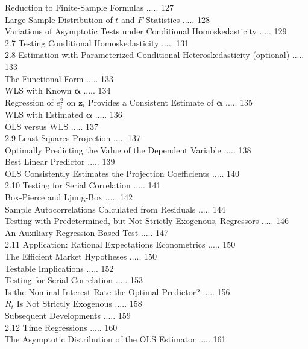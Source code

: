 \documentclass[10pt]{article}
\begin{document}
Reduction to Finite-Sample Formulas ..... 127\\
Large-Sample Distribution of $t$ and $F$ Statistics ..... 128\\
Variations of Asymptotic Tests under Conditional Homoskedasticity ..... 129\\
2.7 Testing Conditional Homoskedasticity ..... 131\\
2.8 Estimation with Parameterized Conditional Heteroskedasticity (optional) ..... 133\\
The Functional Form ..... 133\\
WLS with Known $\boldsymbol{\alpha}$ ..... 134\\
Regression of $e_{i}^{2}$ on $\mathbf{z}_{i}$ Provides a Consistent Estimate of $\boldsymbol{\alpha}$ ..... 135\\
WLS with Estimated $\boldsymbol{\alpha}$ ..... 136\\
OLS versus WLS ..... 137\\
2.9 Least Squares Projection ..... 137\\
Optimally Predicting the Value of the Dependent Variable ..... 138\\
Best Linear Predictor ..... 139\\
OLS Consistently Estimates the Projection Coefficients ..... 140\\
2.10 Testing for Serial Correlation ..... 141\\
Box-Pierce and Ljung-Box ..... 142\\
Sample Autocorrelations Calculated from Residuals ..... 144\\
Testing with Predetermined, but Not Strictly Exogenous, Regressors ..... 146\\
An Auxiliary Regression-Based Test ..... 147\\
2.11 Application: Rational Expectations Econometrics ..... 150\\
The Efficient Market Hypotheses ..... 150\\
Testable Implications ..... 152\\
Testing for Serial Correlation ..... 153\\
Is the Nominal Interest Rate the Optimal Predictor? ..... 156\\
$R_{t}$ Is Not Strictly Exogenous ..... 158\\
Subsequent Developments ..... 159\\
2.12 Time Regressions ..... 160\\
The Asymptotic Distribution of the OLS Estimator ..... 161\\
\end{document}
